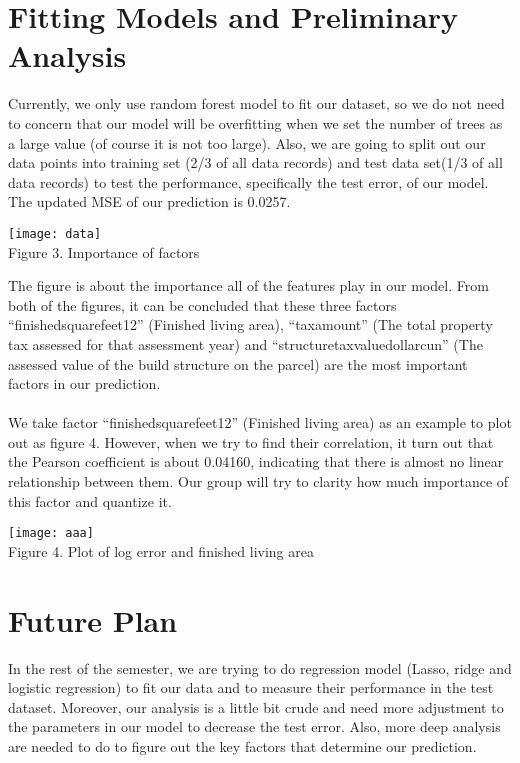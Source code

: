 \documentclass[12pt]{article}
\begin{document}
\section{Fitting Models and Preliminary Analysis}
Currently, we only use random forest model to fit our dataset, so we do not need to concern that our model will be overfitting when we set the number of trees as a large value (of course it is not too large). Also, we are going to split out our data points into training set (2/3 of all data records) and test data set(1/3 of all data records) to test the performance, specifically the test error, of our model.  The updated MSE of our prediction is 0.0257. \\
\begin{center}
\texttt{[image: data]}\\
Figure 3. Importance of factors
\end{center}
The figure is about the importance all of the features play in our model. From both of the figures, it can be concluded that these three factors “finishedsquarefeet12” (Finished living area), “taxamount” (The total property tax assessed for that assessment year) and “structuretaxvaluedollarcun” (The assessed value of the build structure on the parcel) are the most important factors in our prediction. \\
\\We take factor “finishedsquarefeet12” (Finished living area) as an example to plot out as figure 4. However, when we try to find their correlation, it turn out that the Pearson coefficient is about 0.04160, indicating that there is almost no linear relationship between them. Our group will try to clarity how much importance of this factor and quantize it. 
\begin{center}
\texttt{[image: aaa]}\\
Figure 4. Plot of log error and finished living area
\end{center}

\section{Future Plan}
In the rest of the semester, we are trying to do regression model (Lasso, ridge and logistic regression) to fit our data and to measure their performance in the test dataset. Moreover, our analysis is a little bit crude and need more adjustment to the parameters in our model to decrease the test error. Also, more deep analysis are needed to do to figure out the key factors that determine our prediction.
\end{document}
